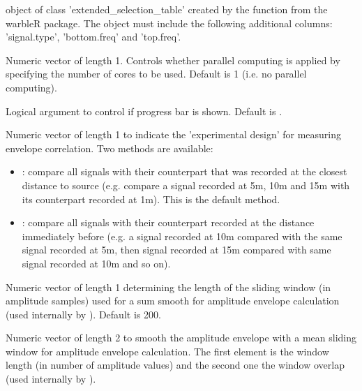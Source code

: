 \documentclass[letterpaper]{book}
\begin{document}
\begin{Arguments}
\begin{ldescription}
\item[\code{X}] object of class 'extended\_selection\_table' created by the function  from the warbleR package. The object must include the following additional columns: 'signal.type', 'bottom.freq' and 'top.freq'.

\item[\code{parallel}] Numeric vector of length 1. Controls whether parallel computing is applied by specifying the number of cores to be used. Default is 1 (i.e. no parallel computing).

\item[\code{pb}] Logical argument to control if progress bar is shown. Default is .

\item[\code{method}] Numeric vector of length 1 to indicate the 'experimental design' for measuring envelope correlation. Two methods are available:
\begin{itemize}

\item{} : compare all signals with their counterpart that was recorded at the closest distance to source (e.g. compare a signal recorded at 5m, 10m and 15m with its counterpart recorded at 1m). This is the default method. 
\item{} : compare all signals with their counterpart recorded at the distance immediately before (e.g. a signal recorded at 10m compared with the same signal recorded at 5m, then signal recorded at 15m compared with same signal recorded at 10m and so on).

\end{itemize}


\item[\code{ssmooth}] Numeric vector of length 1 determining the length of the sliding window (in amplitude samples) used for a sum smooth for amplitude envelope calculation (used internally by ). Default is 200.

\item[\code{msmooth}] Numeric vector of length 2 to smooth the amplitude envelope with a mean sliding window for amplitude envelope calculation. The first element is the window length (in number of amplitude values) and the second one the window overlap (used internally by ).


\end{ldescription}
\end{Arguments}
\end{document}
